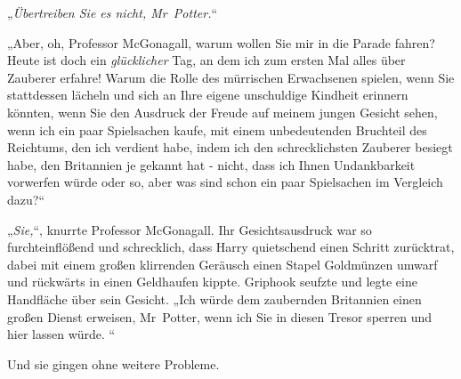 „\emph{Übertreiben Sie es nicht, Mr~Potter.}“

„Aber, oh, Professor McGonagall, warum wollen Sie mir in die Parade fahren? Heute ist doch ein \emph{glücklicher} Tag, an dem ich zum ersten Mal alles über Zauberer erfahre! Warum die Rolle des mürrischen Erwachsenen spielen, wenn Sie stattdessen lächeln und sich an Ihre eigene unschuldige Kindheit erinnern könnten, wenn Sie den Ausdruck der Freude auf meinem jungen Gesicht sehen, wenn ich ein paar Spielsachen kaufe, mit einem unbedeutenden Bruchteil des Reichtums, den ich verdient habe, indem ich den schrecklichsten Zauberer besiegt habe, den Britannien je gekannt hat - nicht, dass ich Ihnen Undankbarkeit vorwerfen würde oder so, aber was sind schon ein paar Spielsachen im Vergleich dazu?“

„\emph{Sie,}“, knurrte Professor McGonagall. Ihr Gesichtsausdruck war so furchteinflößend und schrecklich, dass Harry quietschend einen Schritt zurücktrat, dabei mit einem großen klirrenden Geräusch einen Stapel Goldmünzen umwarf und rückwärts in einen Geldhaufen kippte. Griphook seufzte und legte eine Handfläche über sein Gesicht. „Ich würde dem zaubernden Britannien einen großen Dienst erweisen, Mr~Potter, wenn ich Sie in diesen Tresor sperren und hier lassen würde. “

Und sie gingen ohne weitere Probleme.

